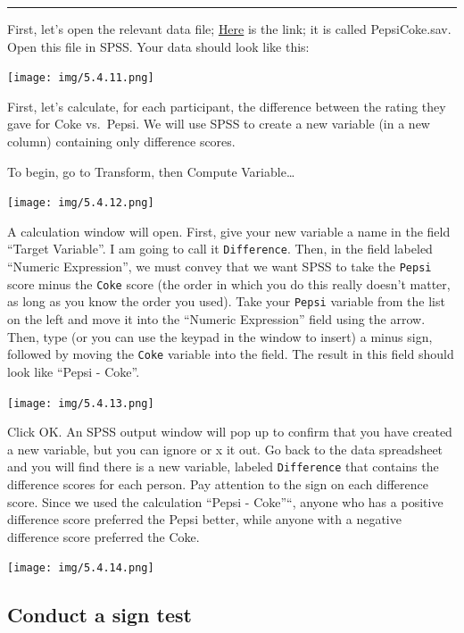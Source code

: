 \documentclass[]{book}
\begin{document}
\begin{center}\rule{0.5\linewidth}{0.5pt}\end{center}

First, let's open the relevant data file;
\href{https://github.com/CrumpLab/statisticsLab/blob/master/data/spssdata/PepsiCoke.sav}{Here}
is the link; it is called PepsiCoke.sav. Open this file in SPSS. Your
data should look like this:

\texttt{[image: img/5.4.11.png]}

First, let's calculate, for each participant, the difference between the
rating they gave for Coke vs.~Pepsi. We will use SPSS to create a new
variable (in a new column) containing only difference scores.

To begin, go to {Transform}, then {Compute Variable\ldots{}}

\texttt{[image: img/5.4.12.png]}

A calculation window will open. First, give your new variable a name in
the field ``Target Variable''. I am going to call it
\texttt{Difference}. Then, in the field labeled ``Numeric Expression'',
we must convey that we want SPSS to take the \texttt{Pepsi} score minus
the \texttt{Coke} score (the order in which you do this really doesn't
matter, as long as you know the order you used). Take your
\texttt{Pepsi} variable from the list on the left and move it into the
``Numeric Expression'' field using the arrow. Then, type (or you can use
the keypad in the window to insert) a minus sign, followed by moving the
\texttt{Coke} variable into the field. The result in this field should
look like ``Pepsi - Coke''.

\texttt{[image: img/5.4.13.png]}

Click {OK}. An SPSS output window will pop up to confirm that you have
created a new variable, but you can ignore or x it out. Go back to the
data spreadsheet and you will find there is a new variable, labeled
\texttt{Difference} that contains the difference scores for each person.
Pay attention to the sign on each difference score. Since we used the
calculation ``Pepsi - Coke''``, anyone who has a positive difference
score preferred the Pepsi better, while anyone with a negative
difference score preferred the Coke.

\texttt{[image: img/5.4.14.png]}

\subsection{Conduct a sign test}\label{conduct-a-sign-test}
\end{document}
